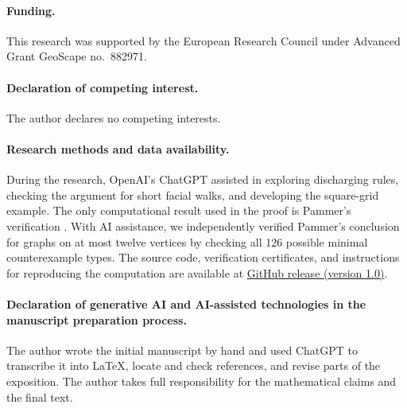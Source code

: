 \documentclass[11pt,a4paper]{article}
\begin{document}
\paragraph{Funding.}
This research was supported by the European Research Council under
Advanced Grant GeoScape no.~882971.

\paragraph{Declaration of competing interest.}
The author declares no competing interests.

\paragraph{Research methods and data availability.}
During the research, OpenAI's ChatGPT assisted in exploring discharging
rules, checking the argument for short facial walks, and developing the
square-grid example. The only computational result
used in the proof is Pammer's verification
\cite[Observation~5.16]{Pammer2014}. With AI assistance, we independently verified Pammer’s conclusion for graphs on at most twelve vertices by checking all 126 possible minimal counterexample types. The source code, verification certificates, and instructions for reproducing the computation are available at \href{https://github.com/DanielGSimon/Conway-s-thrackle-conjecture-12-vertex/releases/tag/v1.0}{GitHub release (version 1.0)}.

\paragraph{Declaration of generative AI and AI-assisted technologies
in the manuscript preparation process.}
The author wrote the initial manuscript by hand and used 
ChatGPT to transcribe it into \LaTeX, locate and check references,
and revise parts of the exposition. The author takes full
responsibility for the mathematical claims and the final text.
\end{document}
